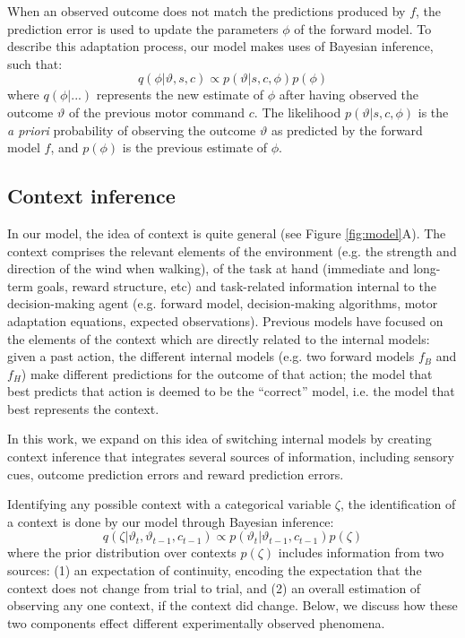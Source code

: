 \documentclass[a4paper,doc,floatsintext,natbib]{apa6}
\def \fref #1{Figure \ref{#1}}     %
\begin{document}
When an observed outcome does not match the predictions produced by $f$, the prediction error is used to update the parameters $\phi$ of the forward model. To describe this adaptation process, our model makes uses of Bayesian inference, such that:
\begin{equation}
q(\phi | \vartheta, s, c) \propto p(\vartheta | s, c, \phi)p(\phi)
\end{equation}
where $q(\phi | ...)$ represents the new estimate of $\phi$ after having observed the outcome $\vartheta$ of the previous motor command $c$. The likelihood $p(\vartheta | s, c, \phi)$ is the \textit{a priori} probability of observing the outcome $\vartheta$ as predicted by the forward model $f$, and $p(\phi)$ is the previous estimate of $\phi$.

\subsection{Context inference}
In our model, the idea of context is quite general (see \fref{fig:model}A). The context comprises the relevant elements of the environment (e.g. the strength and direction of the wind when walking), of the task at hand (immediate and long-term goals, reward structure, etc) and task-related information internal to the decision-making agent (e.g. forward model, decision-making algorithms, motor adaptation equations, expected observations). Previous models \cite[e.g.][]{Wolpert_Multiple_1998,Imamizu_Neural_2008,Oh_Minimizing_2019} have focused on the elements of the context which are directly related to the internal models: given a past action, the different internal models (e.g. two forward models $f_B$ and $f_H$) make different predictions for the outcome of that action; the model that best predicts that action is deemed to be the ``correct'' model, i.e. the model that best represents the context.

In this work, we expand on this idea of switching internal models by creating context inference that integrates several sources of information, including sensory cues, outcome prediction errors and reward prediction errors.

Identifying any possible context with a categorical variable $\zeta$, the identification of a context is done by our model through Bayesian inference:
\begin{equation}
q(\zeta | \vartheta_t, \vartheta_{t-1}, c_{t-1}) \propto p(\vartheta_t | \vartheta_{t-1}, c_{t-1})p(\zeta)
\end{equation}
where the prior distribution over contexts $p(\zeta)$ includes information from two sources: (1) an expectation of continuity, encoding the expectation that the context does not change from trial to trial, and (2) an overall estimation of observing any one context, if the context did change. Below, we discuss how these two components effect different experimentally observed phenomena.
\end{document}
